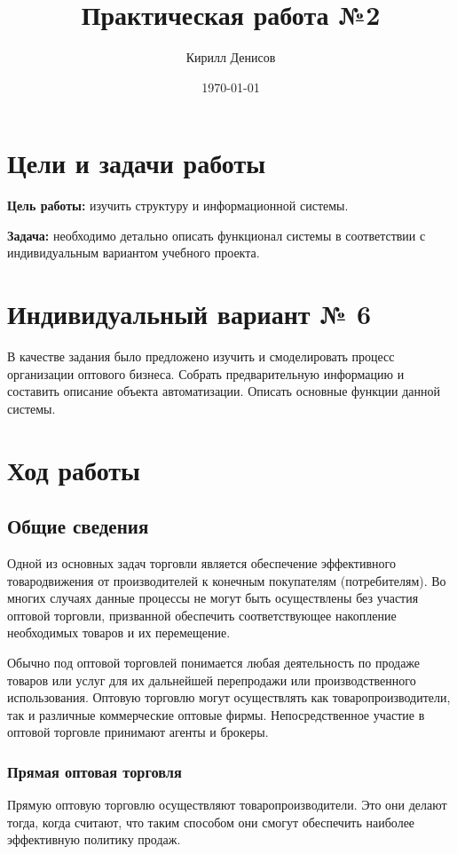 \documentclass[a4paper,14pt]{extarticle}
\author{Кирилл Денисов}
\title{Практическая работа №2}
\date{\today}
\newcommand{\pathToCommonFolder}{/home/denilai/Desktop/LaTeX/Common}
\begin{document}
	\thispagestyle{empty}
	
	
	
	\newpage
	\tableofcontents
	\newpage
	
\section{Цели и задачи работы}
\textbf{Цель работы: }изучить
структуру и
информационной системы.

\textbf{Задача: }
необходимо детально описать функционал системы в соответствии с
индивидуальным вариантом учебного проекта.

\section {Индивидуальный вариант № 6}
В качестве задания было предложено изучить и смоделировать процесс организации оптового бизнеса. Собрать предварительную информацию и составить описание объекта автоматизации. Описать основные функции данной системы.
\section{Ход работы}
\subsection{Общие сведения}
Одной из основных задач торговли является обеспечение эффективного товародвижения от производителей к конечным покупателям (потребителям). Во многих случаях данные процессы не могут быть осуществлены без участия оптовой торговли, призванной обеспечить соответствующее накопление необходимых товаров и их перемещение.

Обычно под оптовой торговлей понимается любая деятельность по продаже товаров или услуг для их дальнейшей перепродажи или производственного использования.
Оптовую торговлю могут осуществлять как товаропроизводители, так и различные коммерческие оптовые фирмы. Непосредственное участие в оптовой торговле принимают агенты и брокеры.
\subsubsection{Прямая оптовая торговля}
Прямую оптовую торговлю осуществляют товаропроизводители. Это они делают тогда, когда считают, что таким способом они смогут обеспечить наиболее эффективную политику продаж.
\end{document}
